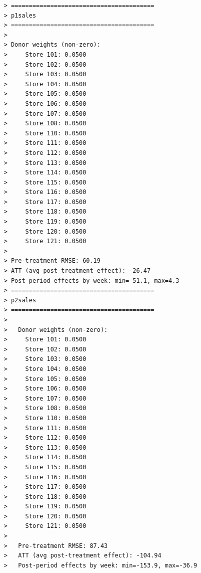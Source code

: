 \documentclass[10pt]{article}
\begin{document}
\begin{verbatim}
    > ========================================
    > p1sales
    > ========================================
    > 
    > Donor weights (non-zero):
    >     Store 101: 0.0500
    >     Store 102: 0.0500
    >     Store 103: 0.0500
    >     Store 104: 0.0500
    >     Store 105: 0.0500
    >     Store 106: 0.0500
    >     Store 107: 0.0500
    >     Store 108: 0.0500
    >     Store 110: 0.0500
    >     Store 111: 0.0500
    >     Store 112: 0.0500
    >     Store 113: 0.0500
    >     Store 114: 0.0500
    >     Store 115: 0.0500
    >     Store 116: 0.0500
    >     Store 117: 0.0500
    >     Store 118: 0.0500
    >     Store 119: 0.0500
    >     Store 120: 0.0500
    >     Store 121: 0.0500
    > 
    > Pre-treatment RMSE: 60.19
    > ATT (avg post-treatment effect): -26.47
    > Post-period effects by week: min=-51.1, max=4.3
    > ========================================
    > p2sales
    > ========================================
    > 
    >   Donor weights (non-zero):
    >     Store 101: 0.0500
    >     Store 102: 0.0500
    >     Store 103: 0.0500
    >     Store 104: 0.0500
    >     Store 105: 0.0500
    >     Store 106: 0.0500
    >     Store 107: 0.0500
    >     Store 108: 0.0500
    >     Store 110: 0.0500
    >     Store 111: 0.0500
    >     Store 112: 0.0500
    >     Store 113: 0.0500
    >     Store 114: 0.0500
    >     Store 115: 0.0500
    >     Store 116: 0.0500
    >     Store 117: 0.0500
    >     Store 118: 0.0500
    >     Store 119: 0.0500
    >     Store 120: 0.0500
    >     Store 121: 0.0500
    > 
    >   Pre-treatment RMSE: 87.43
    >   ATT (avg post-treatment effect): -104.94
    >   Post-period effects by week: min=-153.9, max=-36.9    
\end{verbatim}
\end{document}
